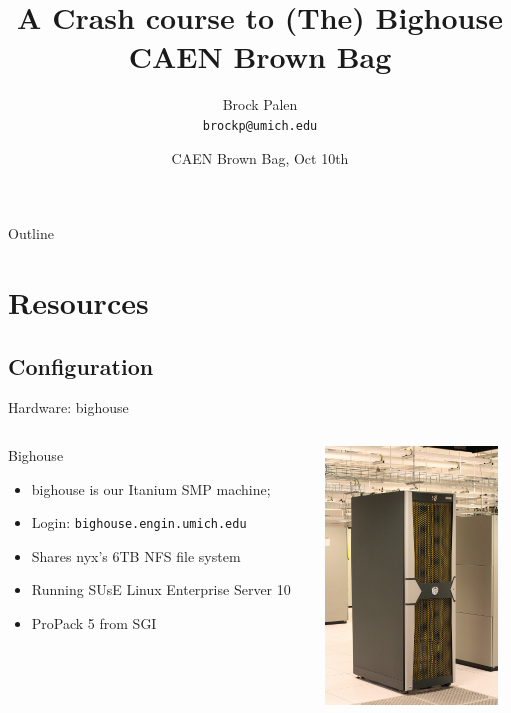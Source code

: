 \documentclass{beamer}
\title[Bighouse Crash] {A Crash course to (The) Bighouse CAEN Brown Bag}
\author{Brock Palen\\ \texttt{brockp@umich.edu}}
\date{CAEN Brown Bag, Oct 10th}
\begin{document}
  \begin{frame}
    \titlepage
  \end{frame}

  \begin{frame}{Outline}
    \tableofcontents
  \end{frame}
  
  \section{Resources}
  \subsection {Configuration}
  \begin{frame}{Hardware: bighouse}
   \begin{columns}[c]
    \begin{column}{7cm}
    \begin{block}{Bighouse}
    \begin{itemize}
      \item bighouse is our Itanium SMP machine;
      \item Login: \texttt{bighouse.engin.umich.edu}
      \item Shares nyx's 6TB NFS file system
      \item Running SUsE Linux Enterprise Server 10
      \item ProPack 5 from SGI
    \end{itemize}
   \end{block}
   \end{column}
   \begin{column}{5cm}
    \begin{center}\includegraphics[height=2.7in]{tallbighouse}\end{center}
   \end{column}
   \end{columns}
  \end{frame}
\end{document}
